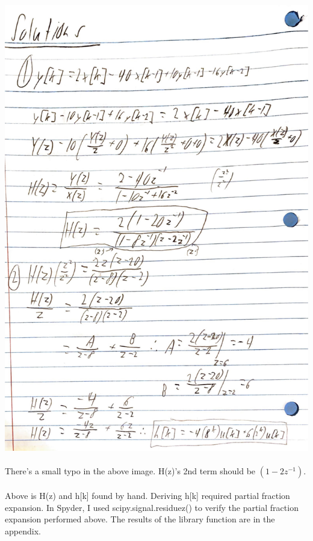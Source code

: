 \documentclass[12pt]{report}
\begin{document}
    \includegraphics[scale=0.15]{FF23EEB3-DFB1-40FC-A79A-8F73C1F11979.jpeg}
    
    \paragraph{} There's a small typo in the above image. H(z)'s 2nd term should be $(1-2z^{-1})$. 
    
    \paragraph{} Above is H(z) and h[k] found by hand. Deriving h[k] required partial fraction expansion. In Spyder, I used scipy.signal.residuez() to verify the partial fraction expansion performed above. The results of the library function are in the appendix. 
    
\end{document}
